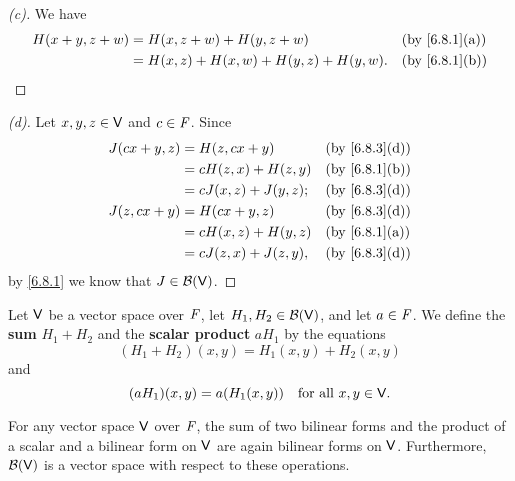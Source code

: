 \begin{proof}[(c)]
  We have
  \begin{align*}
    H(x + y, z + w) & = H(x, z + w) + H(y, z + w)              &  & \by{6.8.1}[a] \\
                    & = H(x, z) + H(x, w) + H(y, z) + H(y, w). &  & \by{6.8.1}[b]
  \end{align*}
\end{proof}

\begin{proof}[(d)]
  Let \(x, y, z \in \mathsf{V}\) and \(c \in \mathit{F}\).
  Since
  \begin{align*}
    J(cx + y, z) & = H(z, cx + y)         &  & \by{6.8.3}[d] \\
                 & = c H(z, x) + H(z, y)  &  & \by{6.8.1}[b] \\
                 & = c J(x, z) + J(y, z); &  & \by{6.8.3}[d] \\
    J(z, cx + y) & = H(cx + y, z)         &  & \by{6.8.3}[d] \\
                 & = c H(x, z) + H(y, z)  &  & \by{6.8.1}[a] \\
                 & = c J(z, x) + J(z, y), &  & \by{6.8.3}[d]
  \end{align*}
  by \cref{6.8.1} we know that \(J \in \mathcal{B}(\mathsf{V})\).
\end{proof}

\begin{defn}\label{6.8.4}
  Let \(\mathsf{V}\) be a vector space over \(\mathit{F}\), let \(H_1, H_2 \in \mathcal{B}(\mathsf{V})\), and let \(a \in \mathit{F}\).
  We define the \textbf{sum} \(H_1 + H_2\) and the \textbf{scalar product} \(a H_1\) by the equations
  \[
    (H_1 + H_2)(x, y) = H_1(x, y) + H_2(x, y)
  \]
  and
  \[
    (a H_1)(x, y) = a (H_1(x, y)) \quad \text{for all } x, y \in \mathsf{V}.
  \]
\end{defn}

\begin{thm}\label{6.31}
  For any vector space \(\mathsf{V}\) over \(\mathit{F}\), the sum of two bilinear forms and the product of a scalar and a bilinear form on \(\mathsf{V}\) are again bilinear forms on \(\mathsf{V}\).
  Furthermore, \(\mathcal{B}(\mathsf{V})\) is a vector space with respect to these operations.
\end{thm}

